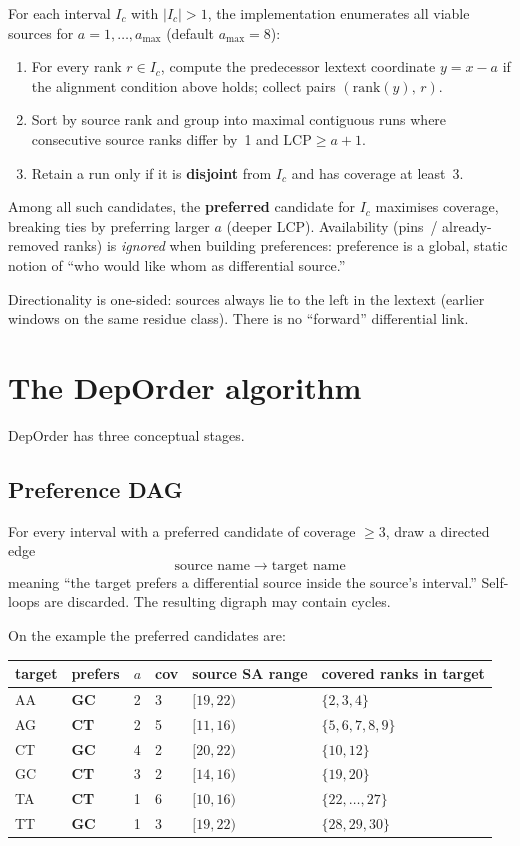 \documentclass[11pt,a4paper]{article}
\begin{document}
For each interval \(I_c\) with \(|I_c|>1\), the implementation
enumerates all viable sources for \(a=1,\ldots,a_{\max}\) (default
\(a_{\max}=8\)):
\begin{enumerate}
\item For every rank \(r\in I_c\), compute the predecessor lextext
  coordinate \(y=x-a\) if the alignment condition above holds; collect
  pairs \((\mathrm{rank}(y),\,r)\).
\item Sort by source rank and group into maximal contiguous runs where
  consecutive source ranks differ by~1 and \(\mathrm{LCP}\ge a+1\).
\item Retain a run only if it is \textbf{disjoint} from \(I_c\) and has
  coverage at least~3.
\end{enumerate}
Among all such candidates, the \textbf{preferred} candidate for
\(I_c\) maximises coverage, breaking ties by preferring larger \(a\)
(deeper LCP). Availability (pins~/ already-removed ranks) is
\emph{ignored} when building preferences: preference is a global,
static notion of ``who would like whom as differential source.''

Directionality is one-sided: sources always lie to the left in the
lextext (earlier windows on the same residue class). There is no
``forward'' differential link.

\section{The DepOrder algorithm}

DepOrder has three conceptual stages.

\subsection{Preference DAG}

For every interval with a preferred candidate of coverage \(\ge 3\),
draw a directed edge
\[
\text{source name}\;\longrightarrow\;\text{target name}
\]
meaning ``the target prefers a differential source inside the source's
interval.'' Self-loops are discarded. The resulting digraph may contain
cycles.

On the example the preferred candidates are:

\begin{center}
\begin{tabular}{@{}llllll@{}}
\toprule
target & prefers & \(a\) & cov & source SA range &
  covered ranks in target \\
\midrule
AA & \textbf{GC} & 2 & 3 & \([19,22)\) & \(\{2,3,4\}\) \\
AG & \textbf{CT} & 2 & 5 & \([11,16)\) & \(\{5,6,7,8,9\}\) \\
CT & \textbf{GC} & 4 & 2 & \([20,22)\) & \(\{10,12\}\) \\
GC & \textbf{CT} & 3 & 2 & \([14,16)\) & \(\{19,20\}\) \\
TA & \textbf{CT} & 1 & 6 & \([10,16)\) & \(\{22,\ldots,27\}\) \\
TT & \textbf{GC} & 1 & 3 & \([19,22)\) & \(\{28,29,30\}\) \\
\bottomrule
\end{tabular}
\end{center}
\end{document}
